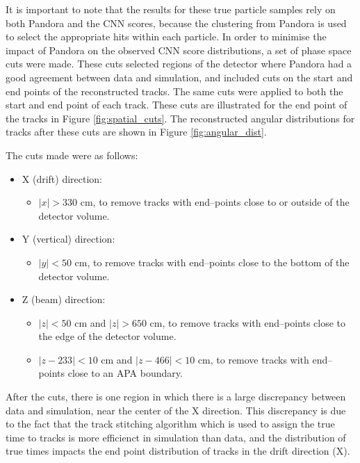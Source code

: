 It is important to note that the results for these true particle samples rely 
on both Pandora and the CNN scores, because the clustering from Pandora is 
used to select the appropriate hits within each particle. In order to minimise
the impact of Pandora on the observed CNN score distributions, a set of phase
space cuts were made. These cuts selected regions of the detector where 
Pandora had a good agreement between data and simulation, and included cuts on 
the start and end points of the reconstructed tracks. The same cuts were 
applied to both the start and end point of each track. These cuts are 
illustrated for the end point of the tracks in Figure \ref{fig:spatial_cuts}. 
The reconstructed angular distributions for tracks after these cuts are shown 
in Figure \ref{fig:angular_dist}.

The cuts made were as follows:
\begin{itemize}
	\item X (drift) direction:
		\begin{itemize}
			\item $|x| > 330$ cm, to remove tracks with end--points close to or 
				outside of the detector volume.
		\end{itemize}
	\item Y (vertical) direction:
		\begin{itemize}
			\item $|y| < 50$ cm, to remove tracks with end--points close to the bottom
				of the detector volume.
		\end{itemize}
	\item Z (beam) direction:
		\begin{itemize}
			\item $|z| < 50$ cm and $|z| > 650$ cm, to remove tracks with end--points 
				close to the edge of the detector volume.
			\item $|z - 233| < 10$ cm and $|z - 466| < 10$ cm, to remove tracks with 
				end--points close to an APA boundary.
		\end{itemize}
\end{itemize}
After the cuts, there is one region in which there is a large discrepancy
between data and simulation, near the center of the X direction. This
discrepancy is due to the fact that the track stitching algorithm which is used
to assign the true time to tracks is more efficienct in simulation than data,
and the distribution of true times impacts the end point distribution of tracks
in the drift direction (X).

